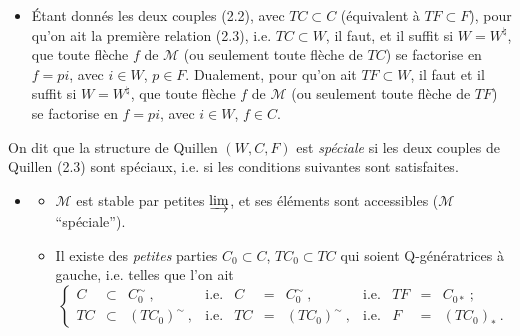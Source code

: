 \documentclass[11pt]{article}
\newcommand{\printedpage}[1]{\marginpar{\footnotesize p.~#1}}
\newcommand{\msp}[1]{\marginpar{\footnotesize [#1]}}
\newcommand{\M}{\mathcal{M}}
\begin{document}
\printedpage{9}

\msp{page 14}

\begin{itemize}[leftmargin=4em]
\item[(2.5)] Étant donnés les deux couples (2.2), avec $TC \subset C$ (équivalent à $TF \subset F$), pour qu'on ait la première relation (2.3), i.e. $TC \subset W$, il faut, et il suffit si $W = W^{\natural}$, que toute flèche $f$ de $\M$ (ou seulement toute flèche de $TC$) se factorise en $f = pi$, avec $i \in W$, $p \in F$. Dualement, pour qu'on ait $TF \subset W$, il faut et il suffit si $W = W^{\natural}$, que toute flèche $f$ de $\M$ (ou seulement toute flèche de $TF$) se factorise en $f = pi$, avec $i \in W$, $f \in C$. %
\end{itemize}

On dit que la structure de Quillen $(W,C,F)$ est \textit{spéciale} si les deux couples de Quillen (2.3) sont spéciaux, i.e. si les conditions suivantes sont satisfaites.

\begin{itemize}[leftmargin=4em]
\item[(2.6)]
\begin{itemize}
\item[a)] $\M$ est stable par petites $\varinjlim$, et ses éléments sont accessibles ($\M$ “spéciale”).
\item[b)] Il existe des \textit{petites} parties $C_0 \subset C$, $TC_0 \subset TC$ qui soient Q-génératrices à gauche, i.e. telles que l'on ait
\[
\left\{
\begin{array}{rclcrclcrcl}
C & \subset & C_0^{\sim}\ , & \text{i.e.} & C & = & C_0^{\sim}\ , & \text{i.e.} & TF & = & C_{0*}\ ;\\
TC & \subset & (TC_0)^{\sim}\ , & \text{i.e.} & TC & = & (TC_0)^{\sim}\ , & \text{i.e.} & F & = & (TC_0)_*\ .
\end{array}\right. %
\]
\end{itemize}
\end{itemize}
\end{document}
